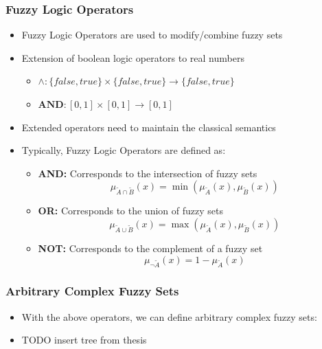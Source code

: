 \documentclass[
	10pt,
	t		%
]{beamer}
\begin{document}
\begin{frame}
	\frametitle{Fuzzy Logic Operators}
	\begin{itemize}
		\item Fuzzy Logic Operators are used to modify/combine fuzzy sets
		\item Extension of boolean logic operators to real numbers
		      \begin{itemize}
			      \item $\wedge : \{false, true\} \times \{false, true\} \rightarrow \{false, true\}$
			      \item $\textbf{AND} : [0,1] \times [0,1] \rightarrow [0,1]$
		      \end{itemize}
		\item Extended operators need to maintain the classical semantics
		\item Typically, Fuzzy Logic Operators are defined as:
		      \begin{itemize}
			      \item \textbf{AND:} Corresponds to the intersection of fuzzy sets
			            \[ \mu_{\tilde{A} \cap \tilde{B}}(x) = \min(\mu_{\tilde{A}}(x), \mu_{\tilde{B}}(x)) \]
			      \item \textbf{OR:} Corresponds to the union of fuzzy sets
			            \[ \mu_{\tilde{A} \cup \tilde{B}}(x) = \max(\mu_{\tilde{A}}(x), \mu_{\tilde{B}}(x)) \]
			      \item \textbf{NOT:} Corresponds to the complement of a fuzzy set
			            \[ \mu_{\neg \tilde{A}}(x) = 1 - \mu_{\tilde{A}}(x) \]

		      \end{itemize}
	\end{itemize}
\end{frame}

\begin{frame}
	\frametitle{Arbitrary Complex Fuzzy Sets}

	\begin{itemize}
		\item With the above operators, we can define arbitrary complex fuzzy sets:
		\item TODO insert tree from thesis
	\end{itemize}
\end{frame}
\end{document}
